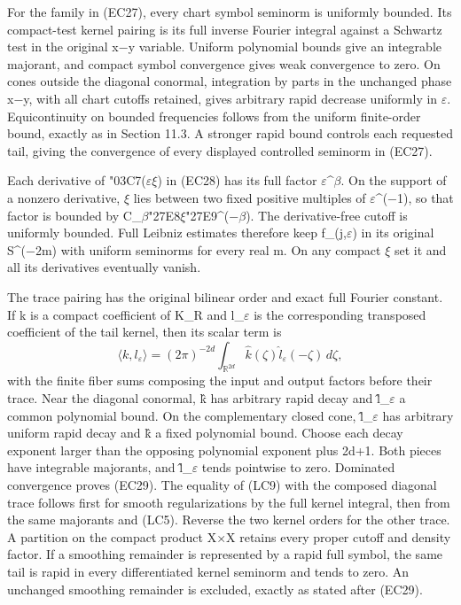 \documentclass[
  11pt,
]{article}
\begin{document}
For the family in (EC27), every chart symbol seminorm is uniformly
bounded. Its compact-test kernel pairing is its full inverse Fourier
integral against a Schwartz test in the original x−y variable. Uniform
polynomial bounds give an integrable majorant, and compact symbol
convergence gives weak convergence to zero. On cones outside the
diagonal conormal, integration by parts in the unchanged phase x−y, with
all chart cutoffs retained, gives arbitrary rapid decrease uniformly in
\ensuremath{\varepsilon}. Equicontinuity on bounded frequencies follows from the uniform
finite-order bound, exactly as in Section 11.3. A stronger rapid bound
controls each requested tail, giving the convergence of every displayed
controlled seminorm in (EC27).

Each derivative of {\ReaderSymbols\char"03C7}(\ensuremath{\varepsilon}\ensuremath{\xi}) in (EC28) has its full factor
\ensuremath{\varepsilon}\^{}\textbar \ensuremath{\beta}\textbar. On the support of a nonzero derivative,
\textbar \ensuremath{\xi}\textbar{} lies between two fixed positive multiples of
\ensuremath{\varepsilon}\^{}(−1), so that factor is bounded by
C\_\ensuremath{\beta}{\ReaderSymbols\char"27E8}\ensuremath{\xi}{\ReaderSymbols\char"27E9}\^{}(−\textbar \ensuremath{\beta}\textbar). The derivative-free cutoff is
uniformly bounded. Full Leibniz estimates therefore keep f\_(j,\ensuremath{\varepsilon}) in its
original S\^{}(−2m) with uniform seminorms for every real m. On any
compact \ensuremath{\xi} set it and all its derivatives eventually vanish.

The trace pairing has the original bilinear order and exact full Fourier
constant. If k is a compact coefficient of K\_R and l\_\ensuremath{\varepsilon} is the
corresponding transposed coefficient of the tail kernel, then its scalar
term is \[
\langle k,l_\varepsilon\rangle
 =(2\pi)^{-2d}\int_{\mathbb R^{2d}}
          \widehat k(\zeta)\widehat l_\varepsilon(-\zeta)\,d\zeta,
\tag{LC9}
\] with the finite fiber sums composing the input and output factors
before their trace. Near the diagonal conormal, k̂ has arbitrary rapid
decay and l̂\_\ensuremath{\varepsilon} a common polynomial bound. On the complementary closed
cone, l̂\_\ensuremath{\varepsilon} has arbitrary uniform rapid decay and k̂ a fixed polynomial
bound. Choose each decay exponent larger than the opposing polynomial
exponent plus 2d+1. Both pieces have integrable majorants, and l̂\_\ensuremath{\varepsilon}
tends pointwise to zero. Dominated convergence proves (EC29). The
equality of (LC9) with the composed diagonal trace follows first for
smooth regularizations by the full kernel integral, then from the same
majorants and (LC5). Reverse the two kernel orders for the other trace.
A partition on the compact product X×X retains every proper cutoff and
density factor. If a smoothing remainder is represented by a rapid full
symbol, the same tail is rapid in every differentiated kernel seminorm
and tends to zero. An unchanged smoothing remainder is excluded, exactly
as stated after (EC29).
\end{document}
